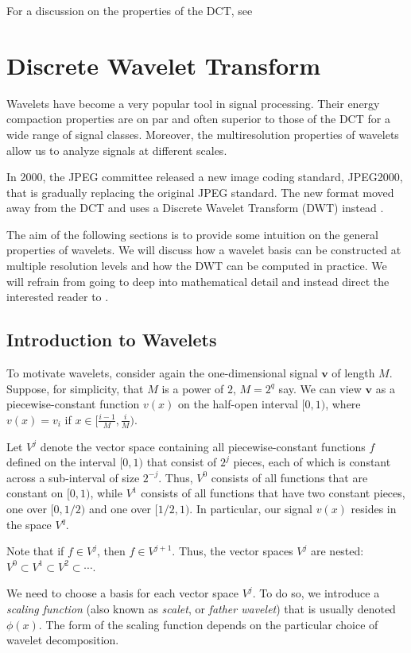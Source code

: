 For a discussion on the properties of the DCT, see \cite{khayam2003}

\section{Discrete Wavelet Transform}
Wavelets have become a very popular tool in signal processing.
Their energy compaction properties are on par and often superior to those of the DCT for a wide range of signal classes.
Moreover, the multiresolution properties of wavelets allow us to analyze signals at different scales.

In 2000, the JPEG committee released a new image coding standard, JPEG2000, that is gradually replacing the original JPEG standard.
The new format moved away from the DCT and uses a Discrete Wavelet Transform (DWT) instead \cite{usevitch2001}.

The aim of the following sections is to provide some intuition on the general properties of wavelets.
We will discuss how a wavelet basis can be constructed at multiple resolution levels and how the DWT can be computed in practice.
We will refrain from going to deep into mathematical detail and instead direct the interested reader to \cite{mallat1999,daubechies1992}.

\subsection{Introduction to Wavelets}
To motivate wavelets, consider again the one-dimensional signal $\bm v$ of length $M$.
Suppose, for simplicity, that $M$ is a power of $2$, $M = 2^q$ say.
We can view $\bm v$ as a piecewise-constant function $v(x)$ on the half-open interval $[0,1)$, where $v(x) = v_i$ if $x \in [\frac{i-1}{M}, \frac{i}{M})$.

Let $V^j$ denote the vector space containing all piecewise-constant functions $f$ defined on the interval $[0,1)$ that consist of $2^j$ pieces, each of which is constant across a sub-interval of size $2^{-j}$.
Thus, $V^0$ consists of all functions that are constant on $[0,1)$, while $V^1$ consists of all functions that have two constant pieces, one over $[0,1/2)$ and one over $[1/2,1)$.
In particular, our signal $v(x)$ resides in the space $V^q$.

Note that if $f \in V^j$, then $f \in V^{j+1}$.
Thus, the vector spaces $V^j$ are nested: $V^0 \subset V^1 \subset V^2 \subset \cdots$.

We need to choose a basis for each vector space $V^j$.
To do so, we introduce a \emph{scaling function} (also known as \emph{scalet}, or \emph{father wavelet}) that is usually denoted $\phi(x)$.
The form of the scaling function depends on the particular choice of wavelet decomposition.

